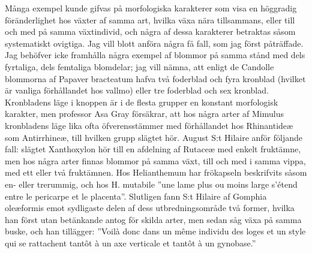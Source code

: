 Många exempel kunde gifvas på morfologiska karakterer som visa en höggradig föränderlighet hos växter af samma art, hvilka växa nära tillsammans, eller till och med på samma växtindivid, och några af dessa karakterer betraktas såsom systematiskt ovigtiga. Jag vill blott anföra några få fall, som jag först påträffade. Jag behöfver icke framhålla några exempel af blommor på samma stånd med dels fyrtaliga, dels femtaliga blomdelar; jag vill nämna, att enligt de Candolle blommorna af Papaver bracteatum hafva två foderblad och fyra kronblad (hvilket är vanliga förhållandet hos vallmo) eller tre foderblad och sex kronblad. Kronbladens läge i knoppen är i de flesta grupper en konstant morfologisk karakter, men professor Asa Gray försäkrar, att hos några arter af Mimulus kronbladens läge lika ofta öfverensstämmer med förhållandet hos Rhinantideæ som Antirrhineæ, till hvilken grupp slägtet hör. August S:t Hilaire anför följande fall: slägtet Xanthoxylon hör till en afdelning af Rutaceæ med enkelt fruktämne, men hos några arter finnas blommor på samma växt, till och med i samma vippa, med ett eller två fruktämnen. Hos Helianthemum har frökapseln beskrifvits såsom en- eller trerummig, och hos H. mutabile ”une lame plus ou moins large s’étend entre le pericarpe et le placenta”. Slutligen fann S:t Hilaire af Gomphia oleæformis emot sydligaste delen af dess utbredningsområde två former, hvilka han först utan betänkande antog för skilda arter, men sedan såg växa på samma buske, och han tillägger: ”Voilà donc dans un même individu des loges et un style qui se rattachent tantôt à un axe verticale et tantôt à un gynobase.”

